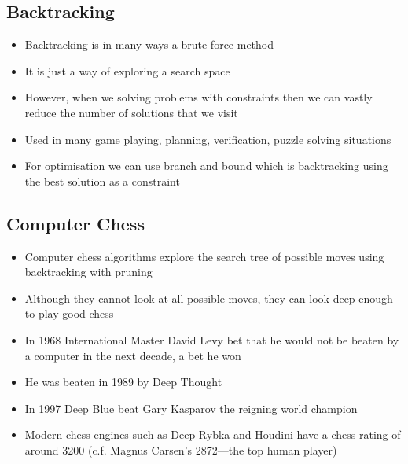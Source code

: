
\begin{slide}
\section{Backtracking}

\begin{PauseHighLight}
  \begin{itemize}
  \item Backtracking is in many ways a brute force method\pause
  \item It is just a way of exploring a search space\pause
  \item However, when we solving problems with constraints then we can
    vastly reduce the number of solutions that we visit\pause
  \item Used in many game playing, planning, verification, puzzle
    solving situations\pause
  \item For optimisation we can use branch and bound which is
    backtracking using the best solution as a constraint\pause
  \end{itemize}
\end{PauseHighLight}

\end{slide}


\begin{slide}
\section[-2]{Computer Chess}

\begin{PauseHighLight}
  \begin{itemize}\squeeze
  \item Computer chess algorithms explore the search tree of possible
    moves using backtracking with pruning\pause
  \item Although they cannot look at all possible moves, they can look
    deep enough to play good chess\pause
  \item In 1968 International Master David Levy bet that he would not be
    beaten by a computer in the next decade, a bet he won\pause
  \item He was beaten in 1989 by Deep Thought\pause
  \item In 1997 Deep Blue beat Gary Kasparov the reigning world
    champion\pause
  \item Modern chess engines such as Deep Rybka and Houdini have a chess
    rating of around 3200 (c.f. Magnus Carsen's 2872---the top human
    player)\pause
  \end{itemize}
\end{PauseHighLight}

\end{slide}

